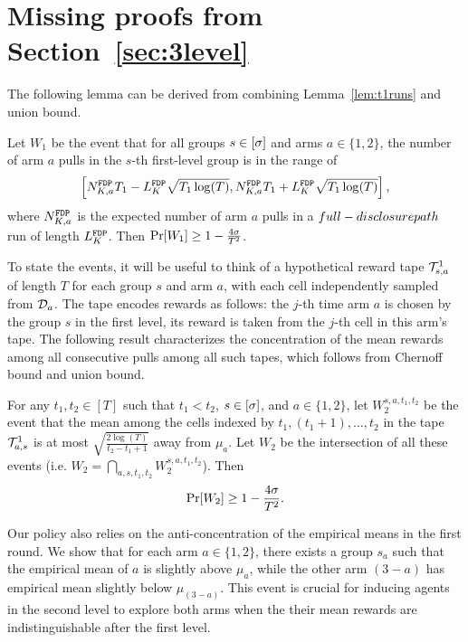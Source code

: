 
\section{Missing proofs from Section~\ref{sec:3level}}
\label{sec:3level-pfs}


The following lemma can be derived from combining Lemma~\ref{lem:t1runs} and union bound.

\begin{lemma}\label{3levelw1}
  Let $W_1$ be the event that for all groups $s\in [\sigma]$ and arms
  $a\in \{1, 2\}$, the number of arm $a$ pulls in the $s$-th
  first-level group is in the range of
  $$
  \left[N^\mathtt{FDP}_{K,a}  T_1- L^\mathtt{FDP}_K \sqrt{T_1\log(T)}, N^\mathtt{FDP}_{K,a}  T_1 + L^\mathtt{FDP}_K \sqrt{T_1\log(T)}\right],
  $$
  where $N^\mathtt{FDP}_{K,a} $ is the expected number of arm $a$ pulls in a $full-disclosure path$ run
  of length $L^\mathtt{FDP}_K$. Then $\Pr[W_1] \geq 1- \frac{4\sigma}{T^2}$.
\end{lemma}

To state the events, it will be useful to think of a
hypothetical reward tape $\mathcal{T}^1_{s, a}$ of length $T$ for each
group $s$ and arm $a$, with each cell independently sampled from
$\mathcal{D}_a$.  The tape encodes rewards as follows: the $j$-th time arm $a$
is chosen by the group $s$ in the first level, its reward is taken
from the $j$-th cell in this arm's tape. The following result
characterizes the concentration of the mean rewards among all
consecutive pulls among all such tapes, which follows from Chernoff
bound and union bound.

\begin{lemma}\label{3levelw2}
  For any $t_1, t_2\in [T]$ such that $t_1 < t_2$, $s\in [\sigma]$, and
  $a\in \{1,2\}$, let $W_2^{s,a,t_1,t_2}$ be the event that the mean
  among the cells indexed by $t_1, (t_1+1), \ldots, t_2$ in the tape
  $\mathcal{T}^1_{a, s}$ is at most $\sqrt{\frac{2\log(T)}{t_2-t_1+1}}$ away
  from $\mu_a$.  Let $W_2$ be the intersection of all these events
  (i.e.  $W_2 = \bigcap_{a,s,t_1,t_2} W_2^{s,a,t_1,t_2}$). Then
  \[
    \Pr[W_2] \geq 1- \frac{4\sigma}{T^2}.
  \]
\end{lemma}

Our policy also relies on the anti-concentration of the empirical
means in the first round. We show that for each arm $a\in \{1, 2\}$,
there exists a group $s_a$ such that the empirical mean of $a$ is
slightly above $\mu_a$, while the other arm $(3 - a)$ has empirical
mean slightly below $\mu_{(3-a)}$. This event is crucial for inducing
agents in the second level to explore both arms when the their
mean rewards are indistinguishable after the first level.


